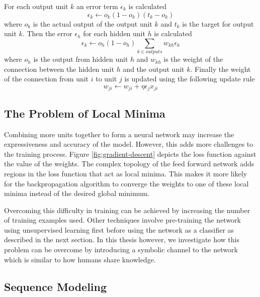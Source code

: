 \documentclass{article}
\begin{document}
	For each output unit $k$ an error term $\epsilon_k$ is calculated
	\begin{equation}
		\epsilon_k \leftarrow o_k (1 - o_k)(t_k - o_k)
	\end{equation}
	where $o_k$ is the actual output of the output unit $k$ and $t_k$ is the target for output unit $k$. Then the error $\epsilon_h$ for each hidden unit $h$ is calculated
	\begin{equation}
		\epsilon_k \leftarrow o_h (1 - o_h) \sum_{k \in outputs} w_{kh} \epsilon_k
	\end{equation}
	where $o_h$ is the output from hidden unit $h$ and $w_{kh}$ is the weight of the connection between the hidden unit $h$ and the output unit $k$. Finally the weight of the connection from unit $i$ to unit $j$ is updated using the following update rule
	\begin{equation}
		w_{ji} \leftarrow w_{ji} + \eta \epsilon_j x_{ji}
	\end{equation}
	
	\subsection{The Problem of Local Minima}
	
	Combining more units together to form a neural network may increase the expressiveness and accuracy of the model. However, this adds more challenges to the training process. Figure \ref{fig:gradient-descent} depicts the loss function against the value of the weights. The complex topology of the feed forward network adds regions in the loss function that act as local minima. This makes it more likely for the backpropagation algorithm to converge the weights to one of these local minima instead of the desired global minimum\cite{Larochelle:2009:EST:1577069.1577070}.
	
	Overcoming this difficulty in training can be achieved by increasing the number of training examples used. Other techniques involve pre-training the network using unsupervised learning first before using the network as a classifier as described in the next section\cite{Larochelle:2009:EST:1577069.1577070}. In this thesis however, we investigate how this problem can be overcome by introducing a symbolic channel to the network which is similar to how humans share knowledge.
	
	\subsection{Sequence Modeling}
	
\end{document}
